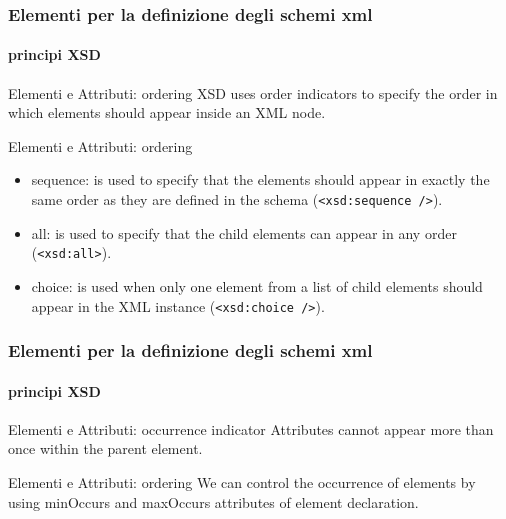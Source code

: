 \begin{frame}
	\frametitle{Elementi per la definizione degli schemi xml}
	\framesubtitle{principi XSD}
	\addtocounter{nframe}{1}

	\begin{block}{Elementi e Attributi: ordering}
		XSD uses order indicators to specify the order in which elements should appear inside an XML node.
	\end{block}

	\begin{block}{Elementi e Attributi: ordering}
		\begin{itemize}
			\item sequence: is used to specify that the elements should appear in exactly the same order as they are defined in the schema (\texttt{<xsd:sequence />}).
			\item all: is used to specify that the child elements can appear in any order (\texttt{<xsd:all>}).
			\item choice: is used when only one element from a list of child elements should appear in the XML instance (\texttt{<xsd:choice />}).
		\end{itemize}
	\end{block}
\end{frame}

\begin{frame}
	\frametitle{Elementi per la definizione degli schemi xml}
	\framesubtitle{principi XSD}
	\addtocounter{nframe}{1}

	\begin{block}{Elementi e Attributi: occurrence indicator}
		Attributes cannot appear more than once within the parent element.
	\end{block}

	\begin{block}{Elementi e Attributi: ordering}
		We can control the occurrence of elements by using minOccurs and maxOccurs attributes of element declaration.
	\end{block}
\end{frame}


